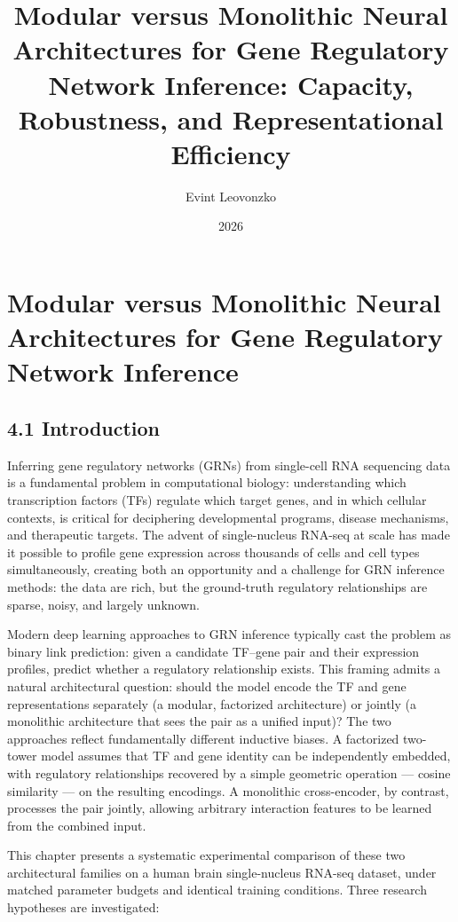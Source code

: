 \documentclass[
  12pt,
]{report}
\title{Modular versus Monolithic Neural Architectures for Gene
Regulatory Network Inference: Capacity, Robustness, and Representational
Efficiency}
\author{Evint Leovonzko}
\date{2026}
\begin{document}
\maketitle

\chapter{Modular versus Monolithic Neural Architectures for Gene Regulatory Network Inference}\label{ch:phase8}

\section{4.1 Introduction}\label{introduction}

Inferring gene regulatory networks (GRNs) from single-cell RNA
sequencing data is a fundamental problem in computational biology:
understanding which transcription factors (TFs) regulate which target
genes, and in which cellular contexts, is critical for deciphering
developmental programs, disease mechanisms, and therapeutic targets. The
advent of single-nucleus RNA-seq at scale has made it possible to
profile gene expression across thousands of cells and cell types
simultaneously, creating both an opportunity and a challenge for GRN
inference methods: the data are rich, but the ground-truth regulatory
relationships are sparse, noisy, and largely unknown.

Modern deep learning approaches to GRN inference typically cast the
problem as binary link prediction: given a candidate TF--gene pair and
their expression profiles, predict whether a regulatory relationship
exists. This framing admits a natural architectural question: should the
model encode the TF and gene representations separately (a modular,
factorized architecture) or jointly (a monolithic architecture that sees
the pair as a unified input)? The two approaches reflect fundamentally
different inductive biases. A factorized two-tower model assumes that TF
and gene identity can be independently embedded, with regulatory
relationships recovered by a simple geometric operation --- cosine
similarity --- on the resulting encodings. A monolithic cross-encoder,
by contrast, processes the pair jointly, allowing arbitrary interaction
features to be learned from the combined input.

This chapter presents a systematic experimental comparison of these two
architectural families on a human brain single-nucleus RNA-seq dataset,
under matched parameter budgets and identical training conditions. Three
research hypotheses are investigated:
\end{document}
